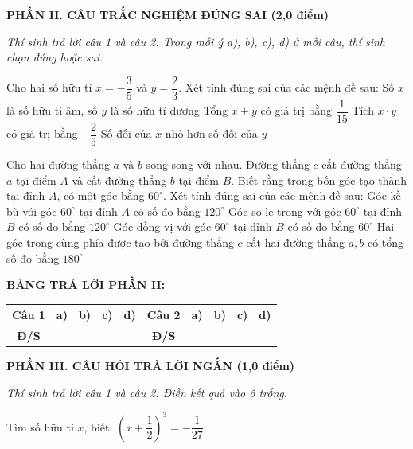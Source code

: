 \documentclass[12pt,a4paper]{article}
\begin{document}
\setcounter{ex}{0}
\noindent\textbf{\large PHẦN II. CÂU TRẮC NGHIỆM ĐÚNG SAI (2,0 điểm)}

\textit{Thí sinh trả lời câu 1 và câu 2. Trong mỗi ý a), b), c), d) ở mỗi câu, thí sinh chọn đúng hoặc sai.}

\vspace{1mm}
\begin{ex}
Cho hai số hữu tỉ $x = -\dfrac{3}{5}$ và $y = \dfrac{2}{3}$. Xét tính đúng sai của các mệnh đề sau:
\choiceTF
{\True Số $x$ là số hữu tỉ âm, số $y$ là số hữu tỉ dương}
{\True Tổng $x + y$ có giá trị bằng $\dfrac{1}{15}$}
{\True Tích $x \cdot y$ có giá trị bằng $-\dfrac{2}{5}$}
{Số đối của $x$ nhỏ hơn số đối của $y$}
\end{ex}

\begin{ex}
Cho hai đường thẳng $a$ và $b$ song song với nhau. Đường thẳng $c$ cắt đường thẳng $a$ tại điểm $A$ và cắt đường thẳng $b$ tại điểm $B$. Biết rằng trong bốn góc tạo thành tại đỉnh $A$, có một góc bằng $60^\circ$. Xét tính đúng sai của các mệnh đề sau:
\choiceTF
{\True Góc kề bù với góc $60^\circ$ tại đỉnh $A$ có số đo bằng $120^\circ$}
{Góc so le trong với góc $60^\circ$ tại đỉnh $B$ có số đo bằng $120^\circ$}
{\True Góc đồng vị với góc $60^\circ$ tại đỉnh $B$ có số đo bằng $60^\circ$}
{\True Hai góc trong cùng phía được tạo bởi đường thẳng $c$ cắt hai đường thẳng $a, b$ có tổng số đo bằng $180^\circ$}
\end{ex}


\noindent\textbf{BẢNG TRẢ LỜI PHẦN II:}
\begin{center}
\begin{tabular}{|c|c|c|c|c||c|c|c|c|c|}
\hline
\textbf{Câu 1} & \textbf{a)} & \textbf{b)} & \textbf{c)} & \textbf{d)} & \textbf{Câu 2} & \textbf{a)} & \textbf{b)} & \textbf{c)} & \textbf{d)} \\
\hline
\textbf{Đ/S} & \rule{0pt}{0.6cm} & & & & \textbf{Đ/S} & & & & \\
\hline
\end{tabular}
\end{center}
\vspace{2mm}

\setcounter{ex}{0}
\noindent\textbf{\large PHẦN III. CÂU HỎI TRẢ LỜI NGẮN (1,0 điểm)}

\textit{Thí sinh trả lời câu 1 và câu 2. Điền kết quả vào ô trống.}

\vspace{1mm}
\begin{ex}
Tìm số hữu tỉ $x$, biết: $\left(x + \dfrac{1}{2}\right)^3 = -\dfrac{1}{27}$. 
\end{ex}
\end{document}
